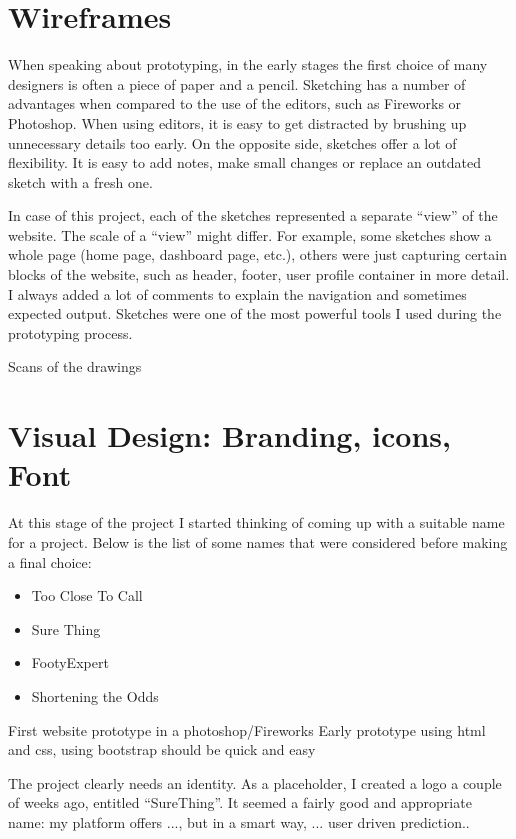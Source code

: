 \section{Wireframes}
\label{sec:wireframes_prototype}
When speaking about prototyping, in the early stages the first choice of many designers is often a piece of paper and a pencil. Sketching has a number of advantages when compared to the use of the editors, such as Fireworks or Photoshop. When using editors, it is easy to get distracted by brushing up unnecessary details too early. On the opposite side, sketches offer a lot of flexibility. It is easy to add notes, make small changes or replace an outdated sketch with a fresh one.

In case of this project, each of the sketches represented a separate “view” of the website. The scale of a “view” might differ. For example, some sketches show a whole page (home page, dashboard page, etc.), others were just capturing certain blocks of the website, such as header, footer, user profile container in more detail. I always added a lot of comments to explain the navigation and sometimes expected output. Sketches were one of the most powerful tools I used during the prototyping process. 


Scans of the drawings

\section{Visual Design: Branding, icons, Font}
\label{sec:visdesign_prototype}
At this stage of the project I started thinking of coming up with a suitable name for a project. Below is the list of some names that were considered before making a final choice:

\begin{itemize}
	\item Too Close To Call
	\item Sure Thing
	\item FootyExpert
	\item Shortening the Odds
\end{itemize}


First website prototype in a photoshop/Fireworks
Early prototype using html and css, using bootstrap should be quick and easy

The project clearly needs an identity. As a placeholder, I created a logo a couple of weeks ago, entitled “SureThing”. It seemed a fairly good and appropriate name: my platform offers ..., but in a smart way, ... user driven prediction..


